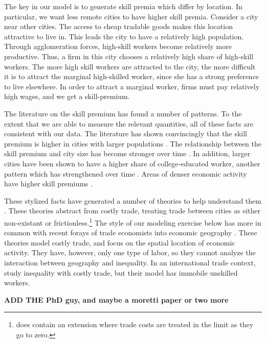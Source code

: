 \documentclass{article}
\begin{document}
The key in our model is to generate skill premia which differ by location.  In particular, we want less remote cities to have higher skill premia.  Consider a city near other cities.  The access to cheap tradable goods makes this location attractive to live in.  This leads the city to have a relatively high population.  Through agglomeration forces, high-skill workers become relatively more productive.  Thus, a firm in this city chooses a relatively high share of high-skill workers.  The more high skill workers are attracted to the city, the more difficult it is to attract the marginal high-skilled worker, since she has a strong preference to live elsewhere.  In order to attract a marginal worker, firms must pay relatively high wages, and we get a skill-premium.

The literature on the skill premium has found a number of patterns.  To the extent that we are able to measure the relevant quantities, all of these facts are consistent with our data.  The literature has shown convincingly that the skill premium is higher in cities with larger populations \citep{davis2012spatial}.  The relationship between the skill premium and city size has become stronger over time \citep{baum2013inequality, lindley2014spatial}.  In addition, larger cities have been shown to have a higher share of college-educated worker, another pattern which has strengthened over time \citep{moretti2008real, lindley2014spatial}.  Areas of denser economic activity have higher skill premiums \citep{combes2012sorting}.

These stylized facts have generated a number of theories to help understand them \citep{davis2012spatial,davis2014comparative,baum2012understanding,combes2012sorting}.  These theories abstract from costly trade, treating trade between cities as either non-existant or frictionless.\footnote{\citet{davis2012spatial} does contain an extension where trade costs are treated in the limit as they go to zero.}  The style of our modeling exercise below has more in common with recent forays of trade economists into economic geography \citep{allen2014trade,desmet2014geography}.  These theories model costly trade, and focus on the spatial location of economic activity. They have, however, only one type of labor, so they cannot analyze the interaction between geography and inequality.  In an international trade context, \citet{fujita2006globalization} study inequality with costly trade, but their model has immobile unskilled workers.

\textbf{ADD THE PhD guy, and maybe a moretti paper or two more}
\end{document}

